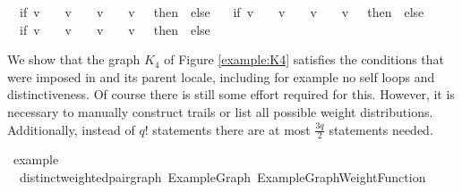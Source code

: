 \begin{isabellebody}
\ \ {\isacharparenleft}if\ {\isacharparenleft}v\ {\isacharequal}\ {}\ {\isasymand}\ v\ {\isacharequal}\ {}{\isacharparenright}\ {\isasymor}\ {\isacharparenleft}v\ {\isacharequal}\ {}\ {\isasymand}\ v\ {\isacharequal}\ {}{\isacharparenright}\ then\ {}\ else\ \isanewline
\ \ {\isacharparenleft}if\ {\isacharparenleft}v\ {\isacharequal}\ {}\ {\isasymand}\ v\ {\isacharequal}\ {}{\isacharparenright}\ {\isasymor}\ {\isacharparenleft}v\ {\isacharequal}\ {}\ {\isasymand}\ v\ {\isacharequal}\ {}{\isacharparenright}\ then\ {}\ else\isanewline
\ \ {\isacharparenleft}if\ {\isacharparenleft}v\ {\isacharequal}\ {}\ {\isasymand}\ v\ {\isacharequal}\ {}{\isacharparenright}\ {\isasymor}\ {\isacharparenleft}v\ {\isacharequal}\ {}\ {\isasymand}\ v\ {\isacharequal}\ {}{\isacharparenright}\ then\ {}\ else\ {}{\isacharparenright}{\isacharparenright}{\isacharparenright}{\isacharparenright}{\isacharparenright}{\isacharparenright}{\isacharparenright}{\isachardoublequoteclose}%
\isadelimproof
%
\endisadelimproof
%
\isatagproof
%
\endisatagproof
{\isafoldproof}%
%
\isadelimproof
%
\endisadelimproof
%
\isadelimproof
%
\endisadelimproof
%
\isatagproof
%
\endisatagproof
{\isafoldproof}%
%
\isadelimproof
%
\endisadelimproof
%
\isadelimproof
%
\endisadelimproof
%
\isatagproof
%
\endisatagproof
{\isafoldproof}%
%
\isadelimproof
%
\endisadelimproof
%
\begin{isamarkuptext}%
We show that the graph $K_4$ of Figure \ref{example:K4} satisfies the conditions that were
imposed in 
 and its parent locale, including for example no self loops 
and distinctiveness. Of course there is still some effort required for this. However, it is necessary
to manually construct trails or list all possible weight distributions. Additionally, instead of 
$q!$ statements there are at most $\frac{3q}{2}$ statements needed.%
\end{isamarkuptext}\isamarkuptrue%
\isamarkupfalse%
\ example{\isacharcolon}\ \isanewline
\ \ distinct{\isacharunderscore}weighted{\isacharunderscore}pair{\isacharunderscore}graph\ ExampleGraph\ ExampleGraphWeightFunction%

\end{isabellebody}
